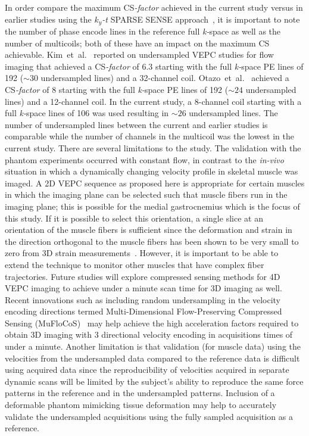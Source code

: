 In order compare the maximum \mbox{CS\textit{-factor}} achieved in the current study versus in earlier studies using the $k_y$\textit{-t} SPARSE SENSE approach~\cite{RNCS9, RNCS10}, it is important to note the number of phase encode lines in the reference full \mbox{\textit{k-}space} as well as the number of multicoils; both of these have an impact on the maximum CS achievable. 
Kim~et~al.~\cite{RNCS10} reported on undersampled VEPC studies for flow imaging that achieved a \mbox{CS\textit{-factor}} of 6.3 starting with the full \mbox{\textit{k-}space} PE lines of 192 ($\sim 30$ undersampled lines) and a 32-channel coil. Otazo~et~al.~\cite{RNCS9} achieved a \mbox{CS\textit{-factor}} of 8 starting with the full \mbox{\textit{k-}space} PE lines of 192 ($\sim 24$ undersampled lines) and a 12-channel coil. 
In the current study, a 8-channel coil starting with a full \mbox{\textit{k-}space} lines of 106 was used resulting in $\sim 26$ undersampled lines. 
The number of undersampled lines between the current and earlier studies is comparable while the number of channels in the multicoil was the lowest in the current study. 
There are several limitations to the study. 
The validation with the phantom experiments occurred with constant flow, in contrast to the \textit{in-vivo} situation in which a dynamically changing velocity profile in skeletal muscle was imaged. 
A 2D VEPC sequence as proposed here is appropriate for certain muscles in which the imaging plane can be selected such that muscle fibers run in the imaging plane; this is possible for the medial gastrocnemius which is the focus of this study. 
If it is possible to select this orientation, a single slice at an orientation of the muscle fibers is sufficient since the deformation and strain in the direction orthogonal to the muscle fibers has been shown to be very small to zero from 3D strain measurements~\cite{RNS31, RNCS11}. 
However, it is important to be able to extend the technique to monitor other muscles that have complex fiber trajectories. 
Future studies will explore compressed sensing methods for 4D VEPC imaging to achieve under a minute scan time for 3D imaging as well. 
Recent innovations such as including random undersampling in the velocity encoding directions termed Multi-Dimensional Flow-Preserving Compressed Sensing (MuFloCoS)~\cite{RNCS22} may help achieve the high acceleration factors required to obtain 3D imaging with 3 directional velocity encoding in acquisitions times of under a minute. 
Another limitation is that validation (for muscle data) using the velocities from the undersampled data compared to the reference data is difficult using acquired data since the reproducibility of velocities acquired in separate dynamic scans will be limited by the subject's ability to reproduce the same force patterns in the reference and in the undersampled patterns. 
Inclusion of a deformable phantom mimicking tissue deformation may help to accurately validate the undersampled acquisitions using the fully sampled acquisition as a reference.

